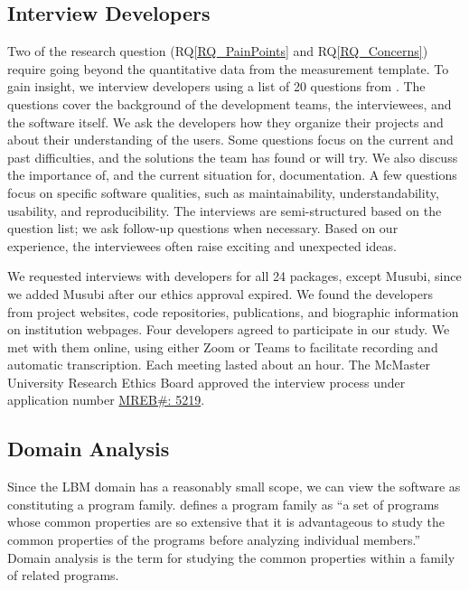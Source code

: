 \documentclass[final, 3p, times, authoryear]{elsarticle}
\newcommand{\rqref}[1]{RQ\ref{#1}}
\begin{document}
\subsection{Interview Developers} \label{SecSurvey}

Two of the research question (\rqref{RQ_PainPoints} and \rqref{RQ_Concerns})
require going beyond the quantitative data from the measurement template. To
gain insight, we interview developers using a list of 20 questions from
\citet{SmithEtAl2021}. The questions cover the background of the development
teams, the interviewees, and the software itself. We ask the developers how they
organize their projects and about their understanding of the users. Some
questions focus on the current and past difficulties, and the solutions the team
has found or will try. We also discuss the importance of, and the current
situation for, documentation. A few questions focus on specific software
qualities, such as maintainability, understandability, usability, and
reproducibility. The interviews are semi-structured based on the question list;
we ask follow-up questions when necessary. Based on our experience, the
interviewees often raise exciting and unexpected ideas.

We requested interviews with developers for all 24 packages, except Musubi,
since we added Musubi after our ethics approval expired. We found the developers
from project websites, code repositories, publications, and biographic
information on institution webpages. Four developers agreed to participate in
our study. We met with them online, using either Zoom or Teams to facilitate
recording and automatic transcription. Each meeting lasted about an hour. The
McMaster University Research Ethics Board approved the interview process under
application number
\href{https://github.com/smiths/AIMSS/blob/master/StateOfPractice/MACREM/Application.pdf}
{MREB\#: 5219}.

\subsection{Domain Analysis} \label{SecDomainAnalysis}

Since the LBM domain has a reasonably small scope, we can view the software as
constituting a program family.  \citet{parnas1976design} defines a program
family as ``a set of programs whose common properties are so extensive that it
is advantageous to study the common properties of the programs before analyzing
individual members.'' Domain analysis is the term for studying the common
properties within a family of related programs.
\end{document}

